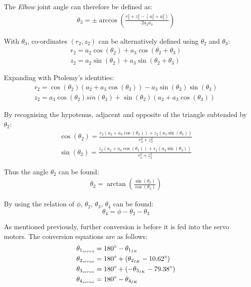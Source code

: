 \documentclass[9pt, a4paper]{article}
\begin{document}
The \textit{Elbow} joint angle can therefore be defined as:
\begin{gather*}
  \theta_3 = \pm \arccos \left( \frac{r_2^2 + z_2^2 - (a_2^2 + a_3^2)}{2 a_2 a_3} \right)
\end{gather*}

With $\theta_3$, co-ordinates $(r_2, z_2)$ can be alternatively defined using
$\theta_2$ and $\theta_3$:
\begin{gather*}
  r_2 = a_2 \cos(\theta_2) + a_3\cos(\theta_2 + \theta_3) \\ 
  z_2 = a_2 \sin(\theta_2) + a_3\sin(\theta_2 + \theta_3)
\end{gather*}

Expanding with Ptolemy's identities:
\begin{gather*}
  r_2 = \cos(\theta_2)\left(a_2 + a_3\cos(\theta_3)\right) - a_3\sin(\theta_2)\sin(\theta_3) \\ 
  z_2 = a_3\cos(\theta_2)sin(\theta_3) + \sin(\theta_2)(a_2 + a_3\cos(\theta_3))
\end{gather*}

By recognising the hypotenus, adjacent and opposite of the triangle subtended by
$\theta_2$:
\begin{gather*}
  \cos(\theta_2) = \frac{r_2(a_2 + a_3 \cos(\theta_3)) + z_2(a_3 \sin(\theta_3))}{r_2^2 + z_2^2} \\ 
  \sin(\theta_2) = \frac{z_2(a_2 + a_3 \cos(\theta_3)) + r_2(a_3 \sin(\theta_3))}{r_2^2 + z_2^2} 
\end{gather*}

Thus the angle $\theta_2$ can be found:
\begin{gather*}
  \theta_2 = \arctan \left(\frac{\sin(\theta_2)}{\cos(\theta_2)}\right)
\end{gather*}

By using the relation of $\phi$, $\theta_2$, $\theta_3$, $\theta_4$ can be
found:
$$
  \theta_4 = \phi - \theta_2 - \theta_3
$$

As mentioned previously, further conversion is before it is fed into the servo
motors. The conversion equations are as follows:
\begin{align*}
  \theta_{1_{servo}} &= 180\degree - \theta_{1_{IK}} \\ 
  \theta_{2_{servo}} &= 180\degree + (\theta_{2_{IK}} - 10.62\degree) \\ 
  \theta_{3_{servo}} &= 180\degree + (-\theta_{3_{IK}} - 79.38\degree) \\ 
  \theta_{4_{servo}} &= 180\degree - \theta_{4_{IK}}
\end{align*}
\end{document}
